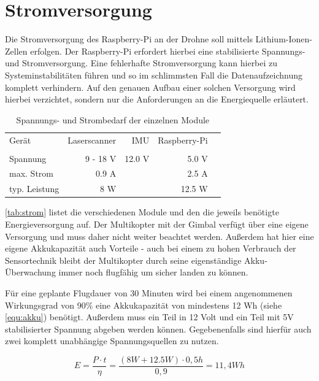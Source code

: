 \documentclass[a4paper,12pt,bibliography=totoc, listof=totoc,titlepage,pointlessnumbers]{scrreprt}
\begin{document}
\section{Stromversorgung}
Die Stromversorgung des Raspberry-Pi an der Drohne soll mittels Lithium-Ionen-Zellen erfolgen. Der Raspberry-Pi erfordert hierbei eine stabilisierte Spannungs- und Stromversorgung. Eine fehlerhafte Stromversorgung kann hierbei zu Systeminstabilitäten führen und so im schlimmsten Fall die Datenaufzeichnung komplett verhindern. Auf den genauen Aufbau einer solchen Versorgung wird hierbei verzichtet, sondern nur die Anforderungen an die Energiequelle erläutert.

\begin{table}
\begin{tabular}{ l | r | r | r | r }
  Gerät 	& Laserscanner	& IMU		& Raspberry-Pi\\
		& \citep{vlpSheet} &		& \citep{raspSheet}	\\
  \hline
  Spannung 	& 9 - 18 V 	&	12.0 V	& 5.0 V \\
  \hline
  max. Strom 	& 0.9 A		&		& 2.5 A \\
  \hline
  typ. Leistung	& 8 W		& 		& 12.5 W 
\end{tabular}
\caption{Spannungs- und Strombedarf der einzelnen Module}
\label{tab:strom}
\end{table}

\autoref{tab:strom} listet die verschiedenen Module und den die jeweils benötigte Energieversorgung auf. Der Multikopter mit der Gimbal verfügt über eine eigene Versorgung und muss daher nicht weiter beachtet werden. Außerdem hat hier eine eigene Akkukapazität auch Vorteile - auch bei einem zu hohen Verbrauch der Sensortechnik bleibt der Multikopter durch seine eigenständige Akku-Überwachung immer noch flugfähig um sicher landen zu können.

Für eine geplante Flugdauer von 30 Minuten wird bei einem angenommenen Wirkungsgrad von 90\% eine Akkukapazität von mindestens 12 Wh  (siehe \autoref{equ:akku}) benötigt. Außerdem muss ein Teil in 12 Volt und ein Teil mit 5V stabilisierter Spannung abgeben werden können. Gegebenenfalls sind hierfür auch zwei komplett unabhängige Spannungsquellen zu nutzen.

\begin{equation}
\label{equ:akku}
E = \frac{ P \cdot t}{\eta} = \frac{(8W + 12.5W) \cdot 0,5h}{0,9} = 11,4 Wh
\end{equation}
\end{document}
